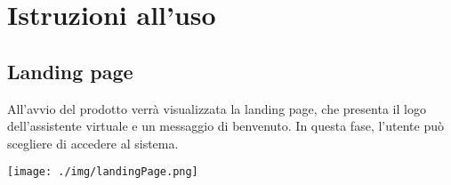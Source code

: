 \section{Istruzioni all'uso}

\subsection{Landing page}
All'avvio del prodotto verrà visualizzata la landing page, che presenta il logo dell'assistente virtuale e un messaggio di benvenuto. In questa fase, l'utente può scegliere di accedere al sistema.
\begin{center}
    \texttt{[image: ./img/landingPage.png]}
\end{center}